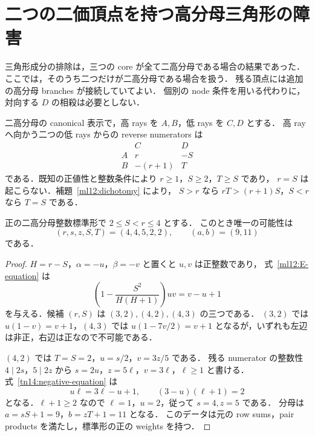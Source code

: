 
\section{二つの二価頂点を持つ高分母三角形の障害}
\label{tn14:section}

三角形成分の排除は，三つの core が全て二高分母である場合の結果であった．
ここでは，そのうち二つだけが二高分母である場合を扱う．
残る頂点には追加の高分母 branches が接続していてよい．
個別の node 条件を用いる代わりに，対向する $D$ の相殺は必要としない．

二高分母の canonical 表示で，高 rays を $A,B$，低 rays を $C,D$ とする．
高 ray へ向かう二つの低 rays からの reverse numerators は
\[
 \begin{array}{c|cc}
  &C&D\\\hline
  A&r&-S\\
  B&-(r+1)&T
 \end{array}
\]
である．既知の正値性と整数条件により $r\geq1$，$S\geq2$，$T\geq S$ であり，
$r=S$ は起こらない．補題~\ref{ml12:dichotomy} により，
$S>r$ なら $rT>(r+1)S$，$S<r$ なら $T=S$ である．

\begin{lemma}
\label{tn14:small-negative-branch}
正の二高分母整数標準形で $2\leq S<r\leq4$ とする．
このとき唯一の可能性は
\[
 (r,s,z,S,T)=(4,4,5,2,2),\qquad (a,b)=(9,11)
\]
である．
\end{lemma}

\begin{proof}
$H=r-S$，$\alpha=-u$，$\beta=-v$ と置くと $u,v$ は正整数であり，
式~\eqref{ml12:E-equation} は
\begin{equation}\label{tn14:negative-equation}
 \left(1-\frac{S^2}{H(H+1)}\right)uv=v-u+1
\end{equation}
を与える．候補 $(r,S)$ は $(3,2),(4,2),(4,3)$ の三つである．
$(3,2)$ では $u(1-v)=v+1$，$(4,3)$ では
$u(1-7v/2)=v+1$ となるが，いずれも左辺は非正，右辺は正なので不可能である．

$(4,2)$ では $T=S=2$，$u=s/2$，$v=3z/5$ である．
残る numerator の整数性 $4\mid2s$，$5\mid2z$ から
$s=2u$，$z=5\ell$，$v=3\ell$，$\ell\geq1$ と書ける．
式~\eqref{tn14:negative-equation} は
\[
 u\ell=3\ell-u+1,
 \qquad (3-u)(\ell+1)=2
\]
となる．$\ell+1\geq2$ なので $\ell=1$，$u=2$，従って $s=4,z=5$ である．
分母は $a=sS+1=9$，$b=zT+1=11$ となる．
このデータは元の row sums，pair products を満たし，標準形の正の weights を持つ．
\end{proof}

